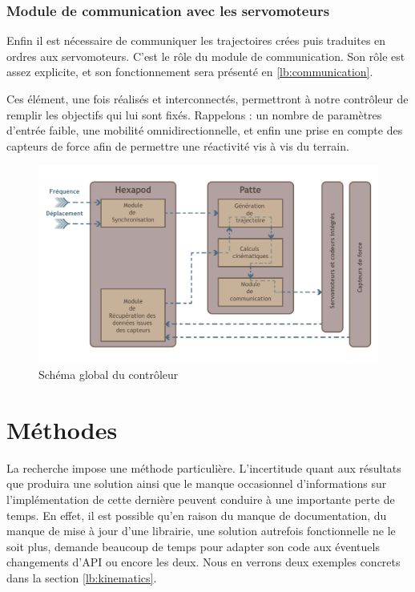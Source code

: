 \documentclass{tnreport}
\begin{document}
\subsubsection{Module de communication avec les servomoteurs}
Enfin il est nécessaire de communiquer les trajectoires crées puis traduites en ordres aux servomoteurs. C'est le rôle du module de communication. Son rôle est assez explicite, et son fonctionnement sera présenté en \ref{lb:communication}.

Ces élément, une fois réalisés et interconnectés, permettront à notre contrôleur de remplir les objectifs qui lui sont fixés. Rappelons : un nombre de paramètres d'entrée faible, une mobilité omnidirectionnelle, et enfin une prise en compte des capteurs de force afin de permettre une réactivité vis à vis du terrain. 
\begin{figure}
    \centering
    \includegraphics[width=17cm,angle=-90]{figures/concept}
    \caption{Schéma global du contrôleur}
    \label{fig:schemectrl}
\end{figure}
\clearpage

\section{Méthodes}
La recherche impose une méthode particulière. L'incertitude quant aux résultats que produira une solution ainsi que le manque occasionnel d'informations sur l'implémentation de cette dernière peuvent conduire à une importante perte de temps. En effet, il est possible qu'en raison du manque de documentation, du manque de mise à jour d'une librairie, une solution autrefois fonctionnelle ne le soit plus, demande beaucoup de temps pour adapter son code aux éventuels changements d'API ou encore les deux. Nous en verrons deux exemples concrets dans la section \ref{lb:kinematics}. 
\end{document}
